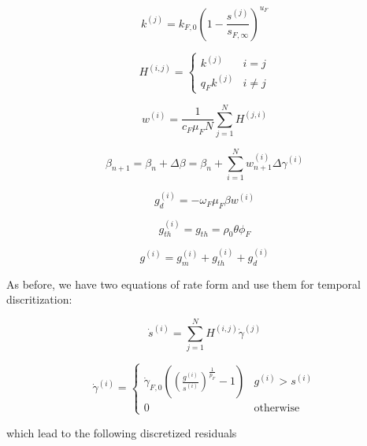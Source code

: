 \documentclass{article}
\begin{document}
\begin{equation}
    k^{(j)} = k_{F,0} \left( 1 - \frac{s^{(j)}}{s_{F,\infty}} \right)^{u_F}
\end{equation}

\begin{equation}
    H^{(i,j)} =
    \begin{cases}
        k^{(j)}       &   i = j\\
        q_F k^{(j)}   &   i \neq j
    \end{cases}
\end{equation}

\begin{equation}
    w^{(i)} = \frac{1}{c_F \mu_F N} \sum_{j=1}^N H^{(j,i)}
\end{equation}

\begin{equation}
    \beta_{n+1} = \beta_n + \Delta \beta = \beta_n + \sum_{i=1}^N w_{n+1}^{(i)} \Delta \gamma^{(i)}
\end{equation}

\begin{equation}
    g_d^{(i)} = - \omega_F \mu_F \beta w^{(i)}
\end{equation}

\begin{equation}
    g_{th}^{(i)} = g_{th} = \rho_0 \theta \phi_F
\end{equation}

\begin{equation}
    g^{(i)} = g_{m}^{(i)} + g_{th}^{(i)} + g_{d}^{(i)}
\end{equation}


As before, we have two equations of rate form and use them for temporal discritization:

\begin{equation}
    \dot{s}^{(i)} = \sum_{j=1}^N H^{(i,j)} \dot{\gamma}^{(j)}
\end{equation}

\begin{equation}
    \dot{\gamma}^{(i)} =
    \begin{cases}
        \displaystyle \dot{\gamma}_{F,0} \left(\left(\frac{g^{(i)}}{s^{(i)}}\right)^{\frac{1}{p_F}} - 1 \right) & g^{(i)} > s^{(i)}\\
        0 & \text{otherwise}
    \end{cases}
\end{equation}

which lead to the following discretized residuals
\end{document}
